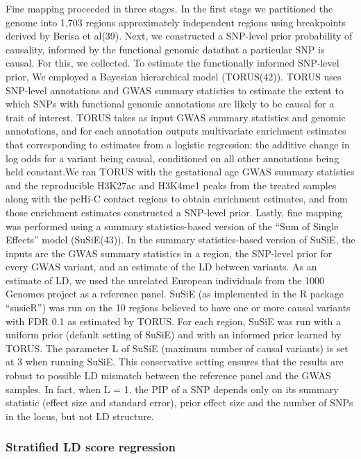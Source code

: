 Fine mapping proceeded in three stages. In the first stage we partitioned the genome into 1,703 regions approximately independent regions using breakpoints derived by Berisa et al(39).
 Next, we constructed a SNP-level prior probability of causality, informed by the functional genomic datathat a particular SNP is causal. For this, we collected. 
To estimate the functionally informed SNP-level prior, We employed a Bayesian hierarchical model (TORUS(42)).  
TORUS uses SNP-level annotations and GWAS summary statistics to estimate the extent to which SNPs with functional genomic annotations are likely to be causal for a trait of interest.  
TORUS takes as input GWAS summary statistics and genomic annotations, and for each annotation outputs multivariate enrichment estimates that corresponding to estimates from a logistic regression: 
the additive change in log odds for a variant being causal, conditioned on all other annotations being held constant.We ran TORUS with the gestational age GWAS summary statistics and the reproducible H3K27ac and H3K4me1 peaks from the treated samples along with the pcHi-C contact regions to obtain enrichment estimates, 
and from those enrichment estimates constructed a SNP-level prior. Lastly, fine mapping was performed using a summary statistics-based version of the “Sum of Single Effects” model (SuSiE(43)).  
In the summary statistics-based version of SuSiE, the inputs are the GWAS summary statistics in a region, the SNP-level prior for every GWAS variant, and an estimate of the LD between variants. 
As an estimate of LD, we used the unrelated European individuals from the 1000 Genomes project as a reference panel. SuSiE (as implemented in the R package “susieR”) was run on the 10 regions 
believed to have one or more causal variants with FDR 0.1 as estimated by TORUS. For each region, SuSiE was run with a uniform prior (default setting of SuSiE) and with an informed prior learned 
by TORUS. The parameter L of SuSiE (maximum number of causal variants) is set at 3 when running SuSiE. This conservative setting ensures that the results are robust to possible LD mismatch between 
the reference panel and the GWAS samples. In fact, when L = 1, the PIP of a SNP depends only on its summary statistic (effect size and standard error), prior effect size and the number of SNPs in the locus, 
but not LD structure.  


\subsubsection{Stratified LD score regression}\label{sec:org3173e32}

